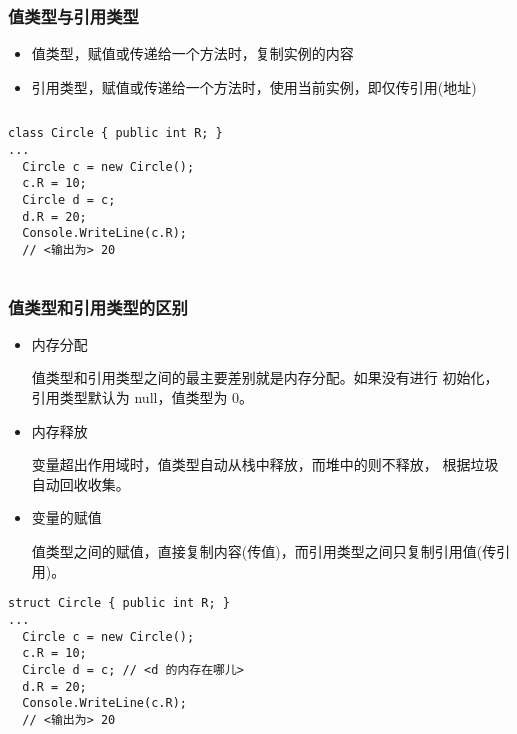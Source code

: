 \begin{frame}[fragile]
\frametitle{值类型与引用类型}
\begin{itemize}
\item 值类型，赋值或传递给一个方法时，复制实例的内容
\item 引用类型，赋值或传递给一个方法时，使用当前实例，即仅传引用(地址)
\end{itemize}
\begin{columns}
\begin{lstlisting}[escapeinside=<>]
class Circle { public int R; }
...
  Circle c = new Circle();
  c.R = 10;
  Circle d = c;
  d.R = 20;
  Console.WriteLine(c.R);
  // <输出为> 20
\end{lstlisting}
\begin{figure}
  \centering
  
\end{figure}
\end{columns}
\end{frame}


\begin{frame}[fragile]
\frametitle{值类型和引用类型的区别}

\begin{itemize}
\item 内存分配

  \CJKindent \small 值类型和引用类型之间的最主要差别就是内存分配。如果没有进行
  初始化，引用类型默认为 null，值类型为 0。
\item 内存释放

  \CJKindent \small 变量超出作用域时，值类型自动从栈中释放，而堆中的则不释放，
  根据垃圾自动回收收集。
\item 变量的赋值

  \CJKindent \small 值类型之间的赋值，直接复制内容({\redwarn 传值})，而引用类型之间只复制引用值({\redwarn 传引用})。
\end{itemize}
\begin{lstlisting}[escapeinside=<>]
struct Circle { public int R; }
...
  Circle c = new Circle();
  c.R = 10;
  Circle d = c; // <d 的内存在哪儿>
  d.R = 20;
  Console.WriteLine(c.R);
  // <输出为> 20

\end{lstlisting}

\end{frame}


